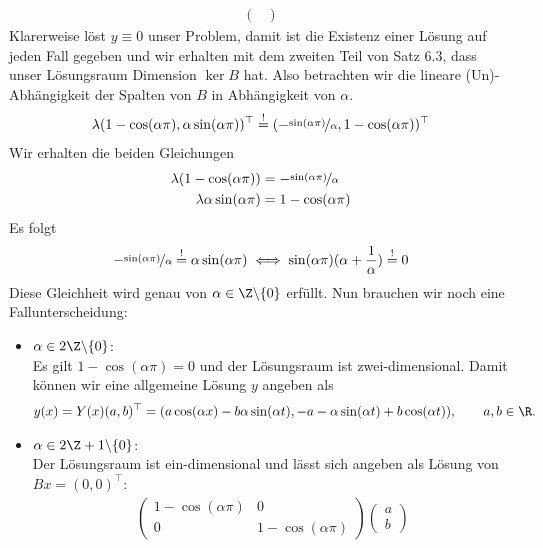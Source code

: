 \begin{solution}
\begin{enumerate}[label = \textbf{\alph*)}]
\begin{align*}
\begin{pmatrix}
    \end{pmatrix}
  \end{align*}
  Klarerweise löst $y \equiv 0$ unser Problem, damit ist die Existenz einer Lösung
  auf jeden Fall gegeben und wir erhalten mit dem zweiten Teil von Satz 6.3, dass
  unser Lösungsraum Dimension $\ker B$ hat. Also betrachten wir die lineare
  (Un)-Abhängigkeit der Spalten von $B$ in Abhängigkeit von $\alpha$.
  \begin{align*}
    \lambda(1 - \cos(\alpha \pi), \alpha\sin(\alpha \pi))^{\top} \stackrel{!}{=}
    (-\nicefrac{\sin(\alpha \pi)}{\alpha},1 - \cos(\alpha \pi))^{\top}
  \end{align*}
  Wir erhalten die beiden Gleichungen
  \begin{align*}
    \lambda(1 - \cos(\alpha \pi)) &= -\nicefrac{\sin(\alpha \pi)}{\alpha} \\
    \lambda\alpha\sin(\alpha \pi) &= 1 - \cos(\alpha \pi)
  \end{align*}
  Es folgt
  \begin{align*}
     -\nicefrac{\sin(\alpha \pi)}{\alpha} \stackrel{!}{=} \alpha\sin(\alpha \pi)
     \iff \sin(\alpha \pi)(\alpha + \frac{1}{\alpha}) \stackrel{!}{=} 0
  \end{align*}
  Diese Gleichheit wird genau von $\alpha \in \Z\backslash\{0\}$ erfüllt. Nun brauchen
  wir noch eine Fallunterscheidung:
  \begin{itemize}
    \item $\alpha \in 2\Z\backslash\{0\}$: \\
    Es gilt $1 - \cos(\alpha \pi) = 0$ und der Lösungsraum ist zwei-dimensional. Damit können wir eine allgemeine Lösung $y$
    angeben als
    \begin{align*}
      y(x) = Y(x)(a,b)^{\top} = (a\cos(\alpha x) - b\alpha\sin(\alpha t), -a-\alpha\sin(\alpha t) + b\cos(\alpha t)), \qquad a,b \in \R.
    \end{align*}
    \item $\alpha \in 2\Z+1\backslash\{0\}$: \\
      Der Lösungsraum ist ein-dimensional und lässt sich angeben als
      Lösung von $Bx = (0,0)^{\top}$:
      \begin{align*}
        \begin{pmatrix}
          1 - \cos(\alpha \pi) & 0 \\
          0 & 1 - \cos(\alpha \pi)
        \end{pmatrix}
        \begin{pmatrix}
          a \\ b

\end{pmatrix}
\end{align*}
\end{itemize}
\end{enumerate}
\end{solution}

